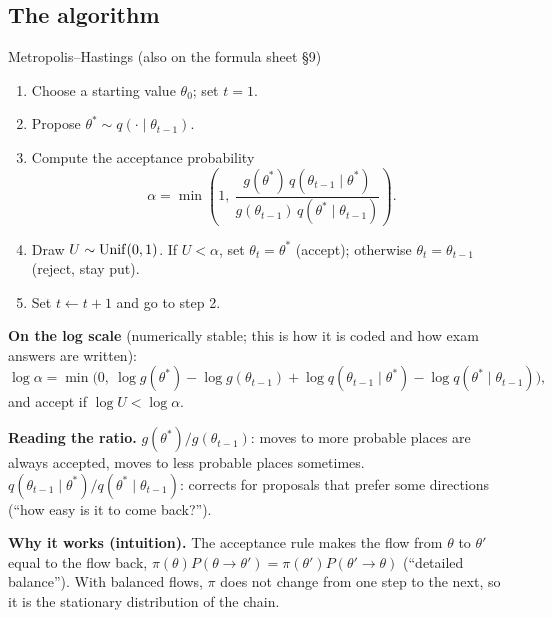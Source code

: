 \subsection{The algorithm}
\begin{algo}{Metropolis--Hastings (also on the formula sheet \S9)}
\begin{enumerate}
  \item Choose a starting value $\theta_0$; set $t=1$.
  \item Propose $\theta^*\sim q(\cdot\mid\theta_{t-1})$.
  \item Compute the acceptance probability
  \[
  \alpha = \min\left(1,\ \frac{g(\theta^*)\,q(\theta_{t-1}\mid\theta^*)}{g(\theta_{t-1})\,q(\theta^*\mid\theta_{t-1})}\right).
  \]
  \item Draw $U\sim\mathrm{Unif}(0,1)$. If $U<\alpha$, set $\theta_t=\theta^*$ (accept); otherwise $\theta_t=\theta_{t-1}$ (reject, stay put).
  \item Set $t\leftarrow t+1$ and go to step 2.
\end{enumerate}
\end{algo}
\textbf{On the log scale} (numerically stable; this is how it is coded and how exam answers are written):
\[
\log\alpha = \min\Big(0,\ \log g(\theta^*)-\log g(\theta_{t-1})+\log q(\theta_{t-1}\mid\theta^*)-\log q(\theta^*\mid\theta_{t-1})\Big),
\]
and accept if $\log U<\log\alpha$.

\textbf{Reading the ratio.} $g(\theta^*)/g(\theta_{t-1})$: moves to more probable places are always accepted, moves to less probable places sometimes. $q(\theta_{t-1}\mid\theta^*)/q(\theta^*\mid\theta_{t-1})$: corrects for proposals that prefer some directions (``how easy is it to come back?'').

\textbf{Why it works (intuition).} The acceptance rule makes the flow from $\theta$ to $\theta'$ equal to the flow back, $\pi(\theta)P(\theta\to\theta') = \pi(\theta')P(\theta'\to\theta)$ (``detailed balance''). With balanced flows, $\pi$ does not change from one step to the next, so it is the stationary distribution of the chain.

